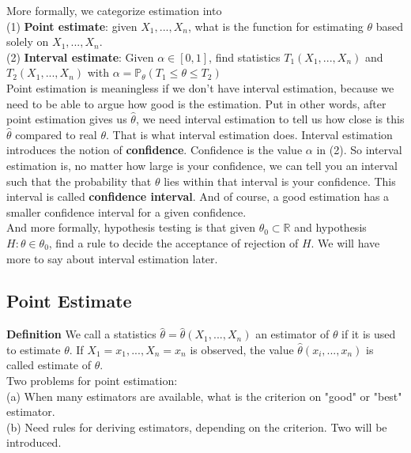 \documentclass[a4paper,12pt]{article}
\begin{document}
More formally, we categorize estimation into\\
(1) \textbf{Point estimate}: given $X_1, ..., X_n$, what is the function for estimating $\theta$ based solely on $X_1, ..., X_n$.\\
(2) \textbf{Interval estimate}: Given $\alpha\in[0, 1]$, find statistics $T_1(X_1, ..., X_n)$ and $T_2(X_1, ..., X_n)$ with $\alpha = \mathbb{P}_{\theta}( T_1 \leq \theta \leq T_2 )$\\

Point estimation is meaningless if we don't have interval estimation, because we need to be able to argue how good is the estimation. Put in other words, after point estimation gives us $\hat{\theta}$, we need interval estimation to tell us how close is this $\hat{\theta}$ compared to real $\theta$. That is what interval estimation does. Interval estimation introduces the notion of \textbf{confidence}. Confidence is the value $\alpha$ in (2). So interval estimation is, no matter how large is your confidence, we can tell you an interval such that the probability that $\theta$ lies within that interval is your confidence. This interval is called \textbf{confidence interval}. And of course, a good estimation has a smaller confidence interval for a given confidence.\\

And more formally, hypothesis testing is that given $\theta_0 \subset \mathbb{R}$ and hypothesis $H: \theta \in \theta_0$, find a rule to decide the acceptance of rejection of $H$. We will have more to say about interval estimation later.\\

\subsection{Point Estimate}

\textbf{Definition} We call a statistics $\hat{\theta} = \hat{\theta} (X_1, ..., X_n)$ an estimator of $\theta$ if it is used to estimate $\theta$. If $X_1 = x_1, ...,  X_n = x_n$ is observed, the value $\hat{\theta} (x_i, ..., x_n)$ is called estimate of $\theta$.\\

Two problems for point estimation:\\
(a) When many estimators are available, what is the criterion on "good" or "best" estimator.\\
(b) Need rules for deriving estimators, depending on the criterion. Two will be introduced.\\
\end{document}

